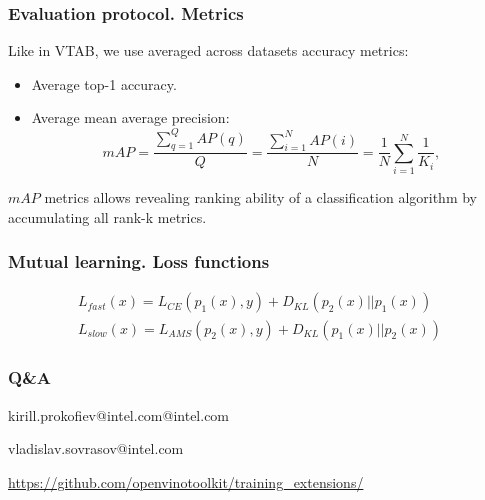 \documentclass[aspectratio=1610]{beamer}
\newcommand\unnumbered{\setbeamertemplate{footline}{}}
\begin{document}
\begin{frame}
  \frametitle{Evaluation protocol. Metrics}
  Like in VTAB, we use averaged across datasets accuracy metrics:
  \begin{itemize}
      \item Average top-1 accuracy.
      \item Average mean average precision:
      \begin{displaymath}
        mAP=\frac{\sum_{q=1}^Q AP(q)}{Q}=\frac{\sum_{i=1}^N AP(i)}{N}=\frac{1}{N}\sum_{i=1}^N \frac{1}{K_i},
      \end{displaymath}
    \end{itemize}
    \(mAP\) metrics allows revealing ranking ability of a classification algorithm by accumulating all rank-k metrics.

\end{frame}

\begin{frame}
  \frametitle{Mutual learning. Loss functions}
  \begin{displaymath}
    \label{eq:equationDML}
    \begin{split}
      L_{fast}(x) = L_{CE}(p_1(x), y) + D_{KL}(p_2(x) || p_1(x))\\
      L_{slow}(x) = L_{AMS}(p_2(x), y) + D_{KL}(p_1(x) || p_2(x))
    \end{split}
  \end{displaymath}
  \begin{figure}
  \end{figure}
\end{frame}

{
\unnumbered
\begin{frame}{{}}
  \frametitle{Q\&A}
  \begin{center}
    kirill.prokofiev@intel.com@intel.com

    vladislav.sovrasov@intel.com

    \url{https://github.com/openvinotoolkit/training_extensions/}
  \end{center}
\end{frame}
}
\end{document}
